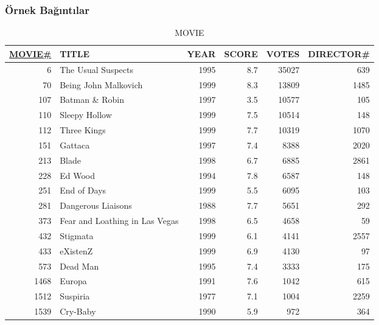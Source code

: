 \documentclass[dvipsnames]{beamer}
\theoremstyle{plain}
\begin{document}
\begin{frame}
  \frametitle{Örnek Bağıntılar}

  \begin{tiny}
  \begin{table}
    \caption{MOVIE}
    \begin{tabular}{|r|l|r|r|r|r|}\hline
\underline{MOVIE\#} & TITLE           & YEAR & SCORE & VOTES & DIRECTOR\#\\[2pt]\hline\hline
   6 & The Usual Suspects             & 1995 &   8.7 & 35027 &        639\\\hline
  70 & Being John Malkovich           & 1999 &   8.3 & 13809 &       1485\\\hline
 107 & Batman \& Robin                & 1997 &   3.5 & 10577 &        105\\\hline
 110 & Sleepy Hollow                  & 1999 &   7.5 & 10514 &        148\\\hline
 112 & Three Kings                    & 1999 &   7.7 & 10319 &       1070\\\hline
 151 & Gattaca                        & 1997 &   7.4 &  8388 &       2020\\\hline
 213 & Blade                          & 1998 &   6.7 &  6885 &       2861\\\hline
 228 & Ed Wood                        & 1994 &   7.8 &  6587 &        148\\\hline
 251 & End of Days                    & 1999 &   5.5 &  6095 &        103\\\hline
 281 & Dangerous Liaisons             & 1988 &   7.7 &  5651 &        292\\\hline
 373 & Fear and Loathing in Las Vegas & 1998 &   6.5 &  4658 &         59\\\hline
 432 & Stigmata                       & 1999 &   6.1 &  4141 &       2557\\\hline
 433 & eXistenZ                       & 1999 &   6.9 &  4130 &         97\\\hline
 573 & Dead Man                       & 1995 &   7.4 &  3333 &        175\\\hline
1468 & Europa                         & 1991 &   7.6 &  1042 &        615\\\hline
1512 & Suspiria                       & 1977 &   7.1 &  1004 &       2259\\\hline
1539 & Cry-Baby                       & 1990 &   5.9 &   972 &        364\\\hline
    \end{tabular}
  \end{table}
  \end{tiny}
\end{frame}
\end{document}
